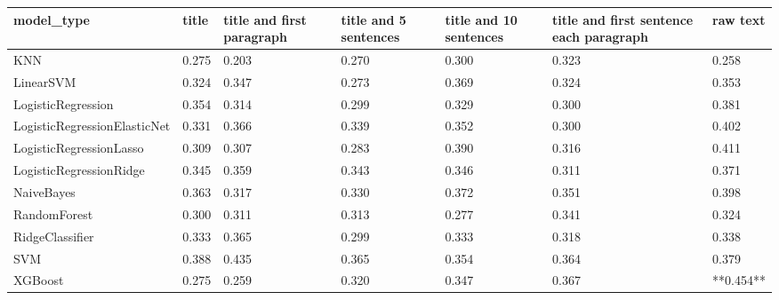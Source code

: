 \begin{tabular}{lllllll}
\toprule
                  model\_type & title & title and first paragraph & title and 5 sentences & title and 10 sentences & title and first sentence each paragraph &  raw text \\
\midrule
                         KNN & 0.275 &                     0.203 &                 0.270 &                  0.300 &                                   0.323 &     0.258 \\
                   LinearSVM & 0.324 &                     0.347 &                 0.273 &                  0.369 &                                   0.324 &     0.353 \\
          LogisticRegression & 0.354 &                     0.314 &                 0.299 &                  0.329 &                                   0.300 &     0.381 \\
LogisticRegressionElasticNet & 0.331 &                     0.366 &                 0.339 &                  0.352 &                                   0.300 &     0.402 \\
     LogisticRegressionLasso & 0.309 &                     0.307 &                 0.283 &                  0.390 &                                   0.316 &     0.411 \\
     LogisticRegressionRidge & 0.345 &                     0.359 &                 0.343 &                  0.346 &                                   0.311 &     0.371 \\
                  NaiveBayes & 0.363 &                     0.317 &                 0.330 &                  0.372 &                                   0.351 &     0.398 \\
                RandomForest & 0.300 &                     0.311 &                 0.313 &                  0.277 &                                   0.341 &     0.324 \\
             RidgeClassifier & 0.333 &                     0.365 &                 0.299 &                  0.333 &                                   0.318 &     0.338 \\
                         SVM & 0.388 &                     0.435 &                 0.365 &                  0.354 &                                   0.364 &     0.379 \\
                     XGBoost & 0.275 &                     0.259 &                 0.320 &                  0.347 &                                   0.367 & **0.454** \\
\bottomrule
\end{tabular}
